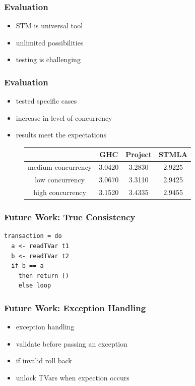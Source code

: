 \documentclass{beamer}
\begin{document}
  

  \begin{frame}
  \frametitle{Evaluation}
  \begin{itemize}\setlength\itemsep{1em}
   \item STM is universal tool
   \item unlimited possibilities
   \item testing is challenging
  \end{itemize}
  \end{frame}

  \begin{frame}
  \frametitle{Evaluation}
  \begin{itemize}\setlength\itemsep{1em}
   \item tested specific cases
   \item increase in level of concurrency
   \item results meet the expectations
  \end{itemize}
  \end{frame}
   
\begin{frame}
\begin{figure}
\centering
 \begin{tabular}[center]{|c|c|c|c|}
  \hline
	                       & GHC    & Project & STMLA  \\ \hline
  medium concurrency  & 3.0420 &  3.2830 & 2.9225 \\ \hline
  low concurrency     & 3.0670 &  3.3110 & 2.9425 \\ \hline
  high concurrency    & 3.1520 &  3.4335 & 2.9455 \\ \hline
 \end{tabular}
\end{figure}
\end{frame}
  
  
 
\begin{frame}[fragile]
\frametitle{Future Work: True Consistency}
\begin{lstlisting}
transaction = do 
  a <- readTVar t1
  b <- readTVar t2
  if b == a 
    then return ()
    else loop
\end{lstlisting}
\end{frame} 
 
 \begin{frame}
  \frametitle{Future Work: Exception Handling}
   \begin{itemize}\setlength\itemsep{1em}
    \item exception handling
    \item validate before passing an exception
    \item if invalid roll back
    \item unlock TVars when expection occurs
   \end{itemize}
  \end{frame}
  
\end{document}
